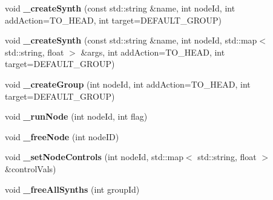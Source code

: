 \begin{DoxyCompactItemize}
\item 
\hypertarget{classColliderPlusPlus_1_1Client__Server_a1ff94df5092263456350196a13a12cc2}{void {\bfseries \-\_\-create\-Synth} (const std\-::string \&name, int node\-Id, int add\-Action=T\-O\-\_\-\-H\-E\-A\-D, int target=D\-E\-F\-A\-U\-L\-T\-\_\-\-G\-R\-O\-U\-P)}\label{classColliderPlusPlus_1_1Client__Server_a1ff94df5092263456350196a13a12cc2}

\item 
\hypertarget{classColliderPlusPlus_1_1Client__Server_ad72cc7de9811b12ea63815cc17dabe8d}{void {\bfseries \-\_\-create\-Synth} (const std\-::string \&name, int node\-Id, std\-::map$<$ std\-::string, float $>$ \&args, int add\-Action=T\-O\-\_\-\-H\-E\-A\-D, int target=D\-E\-F\-A\-U\-L\-T\-\_\-\-G\-R\-O\-U\-P)}\label{classColliderPlusPlus_1_1Client__Server_ad72cc7de9811b12ea63815cc17dabe8d}

\item 
\hypertarget{classColliderPlusPlus_1_1Client__Server_a5f13a514f42e2e7bb0ae975f046f7c17}{void {\bfseries \-\_\-create\-Group} (int node\-Id, int add\-Action=T\-O\-\_\-\-H\-E\-A\-D, int target=D\-E\-F\-A\-U\-L\-T\-\_\-\-G\-R\-O\-U\-P)}\label{classColliderPlusPlus_1_1Client__Server_a5f13a514f42e2e7bb0ae975f046f7c17}

\item 
\hypertarget{classColliderPlusPlus_1_1Client__Server_ab48df010f59d4b4f8275cf6d6b9859eb}{void {\bfseries \-\_\-run\-Node} (int node\-Id, int flag)}\label{classColliderPlusPlus_1_1Client__Server_ab48df010f59d4b4f8275cf6d6b9859eb}

\item 
\hypertarget{classColliderPlusPlus_1_1Client__Server_af22d109a9292a06808871100bdf0abe4}{void {\bfseries \-\_\-free\-Node} (int node\-I\-D)}\label{classColliderPlusPlus_1_1Client__Server_af22d109a9292a06808871100bdf0abe4}

\item 
\hypertarget{classColliderPlusPlus_1_1Client__Server_a0620f55c7167c3094143d905647bf439}{void {\bfseries \-\_\-set\-Node\-Controls} (int node\-Id, std\-::map$<$ std\-::string, float $>$ \&control\-Vals)}\label{classColliderPlusPlus_1_1Client__Server_a0620f55c7167c3094143d905647bf439}

\item 
\hypertarget{classColliderPlusPlus_1_1Client__Server_abab1835658a244782d96777bf88192ed}{void {\bfseries \-\_\-free\-All\-Synths} (int group\-Id)}\label{classColliderPlusPlus_1_1Client__Server_abab1835658a244782d96777bf88192ed}


\end{DoxyCompactItemize}
